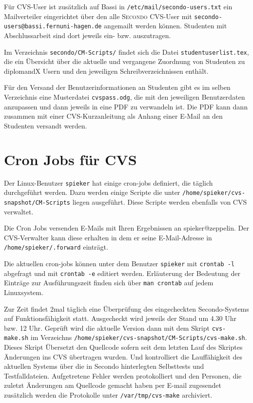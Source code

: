 \documentclass[a4paper, 10pt]{article}
\newcommand{\file}[1]{\texttt{#1}}
\begin{document}
F\"ur CVS-User ist zus\"atzlich auf Bassi in \file{/etc/mail/secondo-users.txt}
ein Mailverteiler eingerichtet \"uber den alle \textsc{Secondo} CVS-User mit
\file{secondo-users@bassi.fernuni-hagen.de}
angemailt werden k\"onnen. Studenten mit Abschlussarbeit sind dort jeweils
ein- bzw. auszutragen.

Im Verzeichnis \file{secondo/CM-Scripts/} findet sich die Datei
\file{studentuserlist.tex}, die ein \"Ubersicht \"uber die aktuelle und vergangene
Zuordnung von Studenten zu diplomandX Usern und den jeweiligen Schreibverzeichnissen
enth\"alt.

F\"ur den Versand der Benutzerinformationen an Studenten gibt es im selben Verzeichnis
eine Musterdatei \file{cvspass.odg}, die mit den jeweiligen Benutzerdaten
anzupassen und dann jeweils in eine PDF zu verwandeln ist. Die PDF kann dann
zusammen mit einer CVS-Kurzanleitung als Anhang einer E-Mail an den Studenten
versandt werden.

\section{Cron Jobs f\"ur CVS}
Der Linux-Benutzer \file{spieker} hat einige cron-jobs definiert, die t\"aglich
durchgef\"uhrt werden. Dazu werden einige Scripte die unter
\file{/home/spieker/cvs-snapshot/CM-Scripts} liegen ausgef\"uhrt.
Diese Scripte werden ebenfalls von CVS verwaltet.

Die Cron Jobs versenden E-Mails mit Ihren Ergebnissen an spieker@zeppelin. Der
CVS-Verwalter kann diese erhalten in dem er seine E-Mail-Adresse in
\file{/home/spieker/.forward} eintr\"agt.

Die aktuellen cron-jobs k\"onnen unter dem Benutzer \file{spieker} mit
\file{crontab -l} abgefragt und mit \file{crontab -e} editiert werden.
Erl\"auterung der Bedeutung der Eintr\"age zur Ausf\"uhrungszeit finden sich
\"uber \file{man crontab} auf jedem Linuxsystem.

Zur Zeit findet 2mal t\"aglich eine \"Uberpr\"ufung des eingecheckten Secondo-Systems
auf Funktionsf\"ahigkeit statt. Ausgecheckt wird jeweils der Stand um 4.30 Uhr bzw.
12 Uhr. Gepr\"uft wird die aktuelle Version dann mit dem Skript \file{cvs-make.sh}
im Verzeichns \file{/home/spieker/cvs-snapshot/CM-Scripts/cvs-make.sh}. Dieses
Skript \"Ubersetzt den Quellcode sofern seit dem letzten Lauf des Skriptes
\"Anderungen ins CVS \"ubertragen wurden. Und kontrolliert die Lauff\"ahigkeit
des aktuellen Systems \"uber die in Secondo hinterlegten Selbsttests und Testfalldateien.
Aufgetretene Fehler werden protokolliert und den Personen, die zuletzt
\"Anderungen am Quellcode gemacht haben per E-mail zugesendet zus\"atzlich
werden die Protokolle unter \file{/var/tmp/cvs-make} archiviert.
\end{document}
